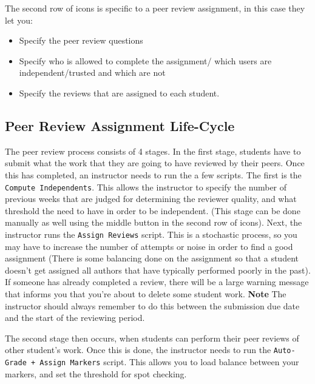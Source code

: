 \documentclass[11pt,letterpaper,oneside]{article}
\begin{document}
The second row of icons is specific to a peer review assignment,  in this case they let you:
\begin{itemize}
  \item Specify the peer review questions
  \item Specify who is allowed to complete the assignment/ which users are independent/trusted and which are not
  \item Specify the reviews that are assigned to each student.
\end{itemize}

\subsection{Peer Review Assignment Life-Cycle}

The peer review process consists of 4 stages. In the first stage, students have to submit what the work that they are going to have reviewed by their peers. Once this has completed, an instructor needs to run the a few scripts. The first is the \texttt{Compute Independents}. This allows the instructor to specify the number of previous weeks that are judged for determining the reviewer quality,  and what threshold the need to have in order to be independent. (This stage can be done manually as well using the middle button in the second row of icons). Next,  the instructor runs the \texttt{Assign Reviews} script. This is a stochastic process, so you may have to increase the number of attempts or noise in order to find a good assignment (There is some balancing done on the assignment so that a student doesn't get assigned all authors that have typically performed poorly in the past). If someone has already completed a review,  there will be a large warning message that informs you that you're about to delete some student work. \textbf{Note} The instructor should always remember to do this between the submission due date and the start of the reviewing period. 

The second stage then occurs,  when students can perform their peer reviews of other student's work. Once this is done,  the instructor needs to run the \texttt{Auto-Grade + Assign Markers} script. This allows you to load balance between your markers,  and set the threshold for spot checking. 
\end{document}
